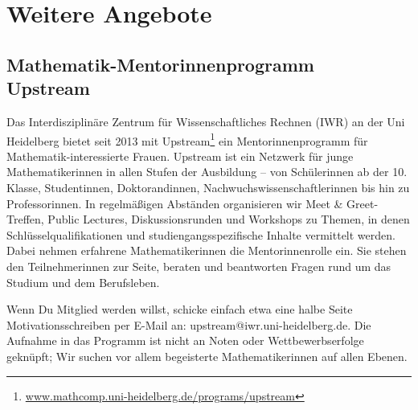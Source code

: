 \section{Weitere Angebote}

\subsection{Mathematik-Mentorinnenprogramm \\Upstream}
Das Interdisziplinäre Zentrum für Wissenschaftliches Rechnen (IWR) an der Uni Heidelberg bietet seit 2013 mit Upstream\footnote{\url{www.mathcomp.uni-heidelberg.de/programs/upstream}} ein Mentorinnenprogramm für Mathematik-interessierte Frauen. Upstream ist ein Netzwerk für junge Mathematikerinnen in allen Stufen der Ausbildung -- von Schülerinnen ab der 10. Klasse, Studentinnen, Doktorandinnen, Nachwuchswissenschaftlerinnen bis hin zu Professorinnen. In regelmäßigen Abständen organisieren wir Meet \& Greet-Treffen, Public Lectures, Diskussionsrunden und Workshops zu Themen, in denen Schlüsselqualifikationen und studiengangsspezifische Inhalte vermittelt werden. Dabei nehmen erfahrene Mathematikerinnen die Mentorinnenrolle ein. Sie stehen den Teilnehmerinnen zur Seite, beraten und beantworten Fragen rund um das Studium und dem Berufsleben.

Wenn Du Mitglied werden willst, schicke einfach etwa eine halbe Seite Motivationsschreiben per E-Mail an: upstream@iwr.uni-heidelberg.de. Die Aufnahme in das Programm ist nicht an Noten oder Wettbewerbserfolge geknüpft; Wir suchen vor allem begeisterte Mathematikerinnen auf allen Ebenen.

